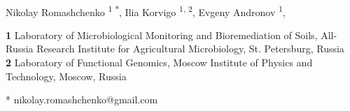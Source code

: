 \documentclass[10pt,letterpaper]{article}
\date{}
\begin{document}
\vspace*{0.2in}

\begin{flushleft}
{\Large
\textbf{} %
}
\newline
\\


Nikolay Romashchenko \textsuperscript{1 $\ast$},
Ilia Korvigo \textsuperscript{1, 2},
Evgeny Andronov \textsuperscript{1},

\bigskip
\textbf{1} Laboratory of Microbiological Monitoring and Bioremediation of Soils, All-Russia Research Institute for Agricultural Microbiology, St. Petersburg, Russia
\\
\textbf{2} Laboratory of Functional Genomics, Moscow Institute of Physics and Technology, Moscow, Russia
\\
\bigskip

% 
%





* nikolay.romashchenko@gmail.com

\end{flushleft}
\end{document}
